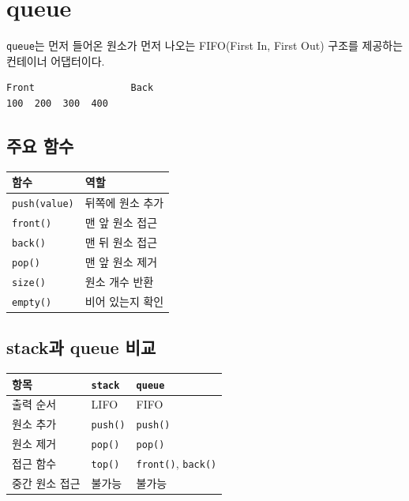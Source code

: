 \documentclass[11pt,a4paper]{article}
\begin{document}
\section{queue}
\texttt{queue}는 먼저 들어온 원소가 먼저 나오는 FIFO(First In, First Out) 구조를 제공하는 컨테이너 어댑터이다.

\begin{verbatim}
Front                 Back
100  200  300  400
\end{verbatim}

\subsection{주요 함수}
\begin{center}
\begin{tabular}{ll}
\toprule
함수 & 역할 \\
\midrule
\texttt{push(value)} & 뒤쪽에 원소 추가 \\
\texttt{front()} & 맨 앞 원소 접근 \\
\texttt{back()} & 맨 뒤 원소 접근 \\
\texttt{pop()} & 맨 앞 원소 제거 \\
\texttt{size()} & 원소 개수 반환 \\
\texttt{empty()} & 비어 있는지 확인 \\
\bottomrule
\end{tabular}
\end{center}

\subsection{stack과 queue 비교}
\begin{center}
\begin{tabular}{lll}
\toprule
항목 & \texttt{stack} & \texttt{queue} \\
\midrule
출력 순서 & LIFO & FIFO \\
원소 추가 & \texttt{push()} & \texttt{push()} \\
원소 제거 & \texttt{pop()} & \texttt{pop()} \\
접근 함수 & \texttt{top()} & \texttt{front()}, \texttt{back()} \\
중간 원소 접근 & 불가능 & 불가능 \\
\bottomrule
\end{tabular}
\end{center}
\end{document}
